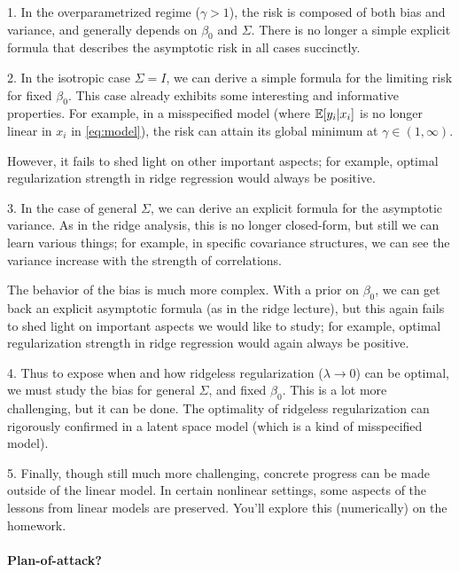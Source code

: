 \documentclass{article}
\begin{document}
\medskip

1. In the overparametrized regime ($\gamma > 1$), the risk is composed of both
bias and variance, and generally depends on $\beta_0$ and $\Sigma$. There is no
longer a simple explicit formula that describes the asymptotic risk in all cases 
succinctly.  

\medskip

2. In the isotropic case $\Sigma = I$, we can derive a simple formula for the
limiting risk for fixed $\beta_0$. This case already exhibits some interesting
and informative properties. For example, in a misspecified model (where
$\mathbb{E}[y_i|x_i]$ is no longer linear in $x_i$ in \eqref{eq:model}), the risk can
attain its global minimum at $\gamma \in (1,\infty)$.

However, it fails to shed light on other important aspects; for example, optimal
regularization strength in ridge regression would always be positive.

\medskip

3. In the case of general $\Sigma$, we can derive an explicit formula for the
asymptotic variance. As in the ridge analysis, this is no longer closed-form,
but still we can learn various things; for example, in specific covariance
structures, we can see the variance increase with the strength of correlations. 

The behavior of the bias is much more complex. With a prior on $\beta_0$, we can 
get back an explicit asymptotic formula (as in the ridge lecture), but this
again fails to shed light on important aspects we would like to study; for
example, optimal regularization strength in ridge regression would again always
be positive.    

\medskip

4. Thus to expose when and how ridgeless regularization ($\lambda \to 0$) can be
optimal, we must study the bias for general $\Sigma$, and fixed $\beta_0$. This
is a lot more challenging, but it can be done. The optimality of ridgeless 
regularization can rigorously confirmed in a latent space model (which is a kind
of misspecified model). 

\medskip

5. Finally, though still much more challenging, concrete progress can be made
outside of the linear model. In certain nonlinear settings, some aspects of the
lessons from linear models are preserved. You'll explore this (numerically) on
the homework.  

\paragraph{Plan-of-attack?}
\end{document}
